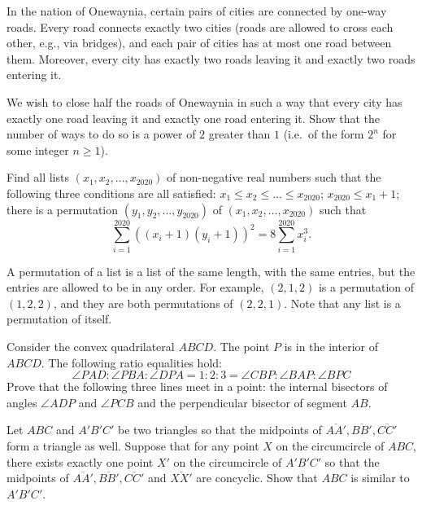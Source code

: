\documentclass[11pt]{scrartcl}
\begin{document}
\begin{problem}[913214378150707]
In the nation of Onewaynia, certain pairs of cities are connected by one-way roads. Every road connects exactly two cities (roads are allowed to cross each other, e.g., via bridges), and each pair of cities has at most one road between them. Moreover, every city has exactly two roads leaving it and exactly two roads entering it.

We wish to close half the roads of Onewaynia in such a way that every city has exactly one road leaving it and exactly one road entering it. Show that the number of ways to do so is a power of $2$ greater than $1$ (i.e.\ of the form $2^n$ for some integer $n \ge 1$).
\end{problem}
\begin{problem}[914387802726278]
	Find all lists $(x_1, x_2, \ldots, x_{2020})$ of non-negative real numbers such that the following three conditions are all satisfied:
$x_1 \le x_2 \le \ldots \le x_{2020}$;
$x_{2020} \le x_1  + 1$;
there is a permutation $(y_1, y_2, \ldots, y_{2020})$ of $(x_1, x_2, \ldots, x_{2020})$ such that$$\sum_{i = 1}^{2020} ((x_i + 1)(y_i + 1))^2 = 8 \sum_{i = 1}^{2020} x_i^3.$$

A permutation of a list is a list of the same length, with the same entries, but the entries are allowed to be in any order. For example, $(2, 1, 2)$ is a permutation of $(1, 2, 2)$, and they are both permutations of $(2, 2, 1)$. Note that any list is a permutation of itself.
\end{problem}
\begin{problem}[915478364939250]
Consider the convex quadrilateral $ABCD$. The point $P$ is in the interior of $ABCD$. The following ratio equalities hold:
\[\angle PAD:\angle PBA:\angle DPA=1:2:3=\angle CBP:\angle BAP:\angle BPC\]Prove that the following three lines meet in a point: the internal bisectors of angles $\angle ADP$ and $\angle PCB$ and the perpendicular bisector of segment $AB$.
\end{problem}
\begin{problem}[915997916422887]
	Let $ABC$ and $A'B'C'$ be two triangles so that the midpoints of $\overline{AA'}, \overline{BB'}, \overline{CC'}$ form a triangle as well. Suppose that for any point $X$ on the circumcircle of $ABC$, there exists exactly one point $X'$ on the circumcircle of $A'B'C'$ so that the midpoints of $\overline{AA'}, \overline{BB'}, \overline{CC'}$ and $\overline{XX'}$ are concyclic. Show that $ABC$ is similar to $A'B'C'$.
\end{problem}
\end{document}
